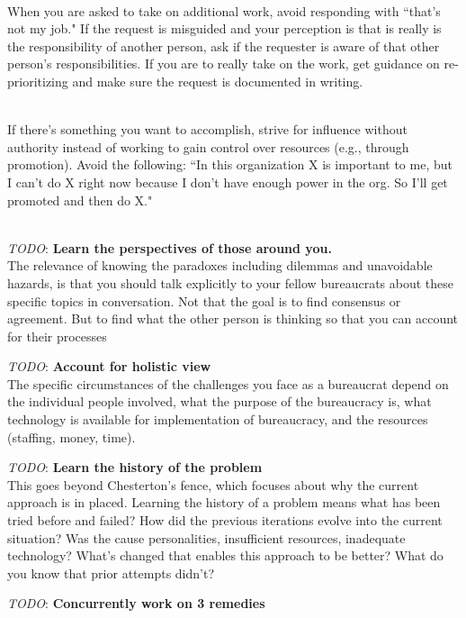 \ \\

When you are asked to take on additional work, avoid responding with ``that's not my job." If the request is misguided and your perception is that is really is the responsibility of another person, ask if the requester is aware of that other person's responsibilities. If you are to really take on the work, get guidance on re-prioritizing and make sure the request is documented in writing. 

\ \\

If there's something you want to accomplish, strive for influence without authority instead of working to gain control over resources (e.g., through promotion). Avoid the following: ``In this organization X is important to me, but I can't do X right now because I don't have enough power in the org. So I'll get promoted and then do X."

\ \\



\textit{TODO}: \textbf{Learn the perspectives of those around you.}\\
The relevance of knowing the paradoxes including dilemmas and unavoidable hazards, is that you should talk explicitly to your fellow bureaucrats about these specific topics in conversation. Not that the goal is to find consensus or agreement. But to find what the other person is thinking so that you can account for their processes


\textit{TODO}: \textbf{Account for holistic view}\\
The specific circumstances of the challenges you face as a bureaucrat depend on the individual people involved, what the purpose of the bureaucracy is, what technology is available for implementation of bureaucracy, and the resources (staffing, money, time). 

\textit{TODO}: \textbf{Learn the history of the problem}\\
This goes beyond Chesterton's fence, which focuses about why the current approach is in placed. Learning the history of a problem means what has been tried before and failed? How did the previous iterations evolve into the current situation? Was the cause personalities, insufficient resources, inadequate technology? What's changed that enables this approach to be better? What do you know that prior attempts didn't?

\textit{TODO}: \textbf{Concurrently work on 3 remedies}\\


